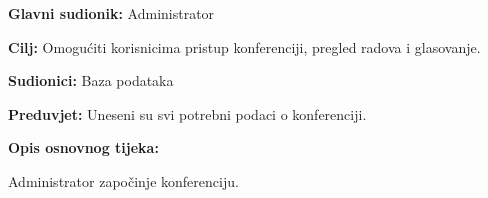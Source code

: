 					\noindent {}
					\begin{packed_item}
						
						\item \textbf{Glavni sudionik: }Administrator
						\item  \textbf{Cilj:} Omogućiti korisnicima pristup konferenciji, pregled radova i glasovanje.
						\item  \textbf{Sudionici:} Baza podataka
						\item  \textbf{Preduvjet:} Uneseni su svi potrebni podaci o konferenciji.
						\item  \textbf{Opis osnovnog tijeka:}
						
						\item[] \begin{packed_enum}
							
							\item Administrator započinje konferenciju.

						\end{packed_enum}
							
					\end{packed_item}
					
